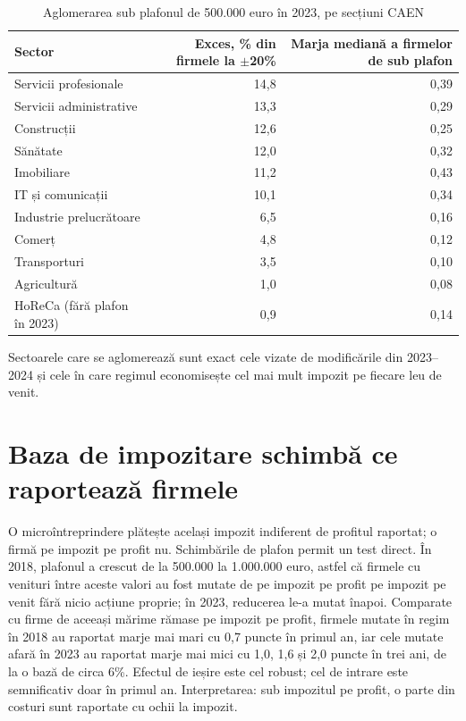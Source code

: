 \documentclass[11pt]{article}
\begin{document}
\begin{table}[!htb]\centering\small
\caption{Aglomerarea sub plafonul de 500.000 euro în 2023, pe secțiuni CAEN}
\begin{tabular}{lrr}\toprule
Sector & Exces, \% din firmele la $\pm$20\% & Marja mediană a firmelor de sub plafon \\ \midrule
Servicii profesionale & 14,8 & 0,39 \\
Servicii administrative & 13,3 & 0,29 \\
Construcții & 12,6 & 0,25 \\
Sănătate & 12,0 & 0,32 \\
Imobiliare & 11,2 & 0,43 \\
IT și comunicații & 10,1 & 0,34 \\
Industrie prelucrătoare & 6,5 & 0,16 \\
Comerț & 4,8 & 0,12 \\
Transporturi & 3,5 & 0,10 \\
Agricultură & 1,0 & 0,08 \\
HoReCa (fără plafon în 2023) & 0,9 & 0,14 \\ \bottomrule
\end{tabular}
\end{table}

Sectoarele care se aglomerează sunt exact cele vizate de modificările din 2023--2024 și cele în care regimul economisește cel mai mult impozit pe fiecare leu de venit.

\section{Baza de impozitare schimbă ce raportează firmele}

O microîntreprindere plătește același impozit indiferent de profitul raportat; o firmă pe impozit pe profit nu. Schimbările de plafon permit un test direct. În 2018, plafonul a crescut de la 500.000 la 1.000.000 euro, astfel că firmele cu venituri între aceste valori au fost mutate de pe impozit pe profit pe impozit pe venit fără nicio acțiune proprie; în 2023, reducerea le-a mutat înapoi. Comparate cu firme de aceeași mărime rămase pe impozit pe profit, firmele mutate în regim în 2018 au raportat marje mai mari cu 0,7 puncte în primul an, iar cele mutate afară în 2023 au raportat marje mai mici cu 1,0, 1,6 și 2,0 puncte în trei ani, de la o bază de circa 6\%. Efectul de ieșire este cel robust; cel de intrare este semnificativ doar în primul an. Interpretarea: sub impozitul pe profit, o parte din costuri sunt raportate cu ochii la impozit.
\end{document}
